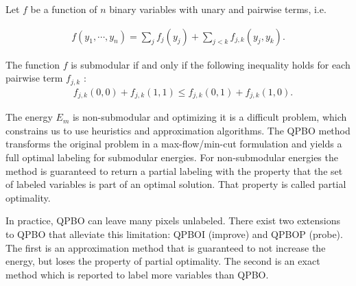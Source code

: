 Let $f$ be a function of $n$ binary variables with unary and pairwise terms, i.e.

\begin{align*}
f(y_1,\cdots, y_n) = \sum_{j}{f_j(y_j)} + \sum_{j < k}{f_{j,k}(y_j,y_k)}.
\end{align*}

The function $f$ is submodular if and only if the following inequality holds for each pairwise term $f_{j,k}$ \cite{kolmogorov04whatenergies}:
\begin{align*}
  \quad f_{j,k}(0,0) + f_{j,k}(1,1) \leq f_{j,k}(0,1) + f_{j,k}(1,0).
\end{align*}

The energy $E_m$ is non-submodular and optimizing it is a difficult problem, which constrains us to use heuristics and
approximation algorithms. The QPBO method \cite{rother07qpbo} transforms the original problem in a max-flow/min-cut
formulation and yields a full optimal labeling for submodular energies. For non-submodular energies the method is
guaranteed to return a partial labeling with the property that the set of labeled variables is part of an optimal
solution. That property is called partial optimality.

In practice, QPBO can leave many pixels unlabeled. There exist two extensions to QPBO that alleviate this limitation:
QPBOI (improve) and QPBOP (probe). The first is an approximation method that is guaranteed to not increase the energy,
but loses the property of partial optimality. The second is an exact method which is reported to label more variables
than QPBO.

